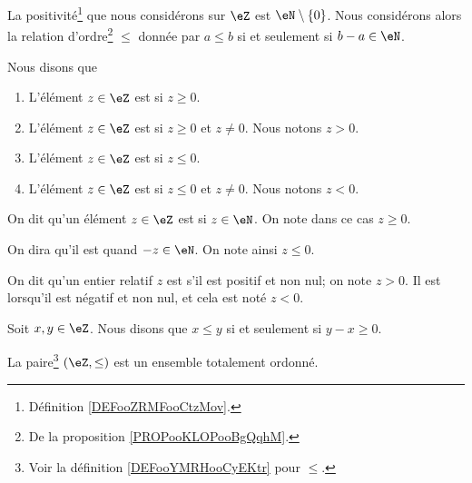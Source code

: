\begin{definition}	\label{DEFooYMRHooCyEKtr}
	La positivité\footnote{Définition \ref{DEFooZRMFooCtzMov}.} que nous considérons sur \( \eZ\) est \( \eN\setminus\{ 0 \}\). Nous considérons alors la relation d'ordre\footnote{De la proposition \ref{PROPooKLOPooBgQqhM}.} \( \leq\) donnée par \( a\leq b\) si et seulement si \( b-a\in \eN\).

	Nous disons que
	\begin{enumerate}
		\item
		      L'élément \( z\in \eZ\) est  si \( z\geq 0\).
		\item
		      L'élément \( z\in \eZ\) est  si \( z\geq 0\) et \( z\neq 0\). Nous notons \( z>0\).
		\item
		      L'élément \( z\in \eZ\) est  si \( z\leq 0\).
		\item
		      L'élément \( z\in \eZ\) est  si \( z\leq 0\) et \( z\neq 0\). Nous notons \( z<0\).
	\end{enumerate}
\end{definition}

\begin{definition}	\label{DEFooRelatifsPositifs}
	On dit qu'un élément \( z \in \eZ \) est  si \( z \in \eN \). On note dans ce cas \( z \geq 0\).

	On dira qu'il est  quand \( -z \in \eN \). On note ainsi \( z \leq 0 \).

	On dit qu'un entier relatif \( z \) est  s'il est positif et non nul; on note \( z > 0 \). Il est  lorsqu'il est négatif et non nul, et cela est noté \( z < 0 \).
\end{definition}


\begin{propositionDef}       \label{PROPooMYYDooOABOdB}
	Soit \( x, y \in \eZ \). Nous disons que \( x\leq y\) si et seulement si \( y-x\geq 0 \).
\end{propositionDef}


\begin{propositionDef}       \label{PROPooMYYDooOABOdB}
	La paire\footnote{Voir la définition \ref{DEFooYMRHooCyEKtr} pour \( \leq\).} \( (\eZ, \leq)\) est un ensemble totalement ordonné.
\end{propositionDef}


